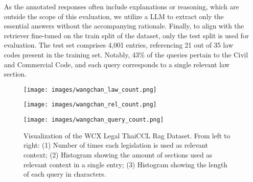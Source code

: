 As the annotated responses often include explanations or reasoning, which are outside the scope of this evaluation, we utilize a LLM to extract only the essential answers without the accompanying rationale. Finally, to align with the retriever fine-tuned on the train split of the dataset, only the test split is used for evaluation. The test set comprises 4,001 entries, referencing 21 out of 35 law codes present in the training set. Notably, 43\% of the queries pertain to the Civil and Commercial Code, and each query corresponds to a single relevant law section.

\begin{figure}[H]
    \centering
    \begin{minipage}{0.46\textwidth}
        \centering
        \texttt{[image: images/wangchan\_law\_count.png]}
    \end{minipage}%
    \hfill
    \begin{minipage}{0.26\textwidth}
        \centering
        \texttt{[image: images/wangchan\_rel\_count.png]}
    \end{minipage}%
    \hfill
    \begin{minipage}{0.26\textwidth}
        \centering
        \texttt{[image: images/wangchan\_query\_count.png]}
    \end{minipage}

    \caption{Visualization of the WCX Legal ThaiCCL Rag Dataset. From left to right: (1) Number of times each legislation is used as relevant context; (2) Histogram showing the amount of sections used as relevant context in a single entry; (3) Histogram showing the length of each query in characters.}
    \label{fig:combined}
\end{figure}


